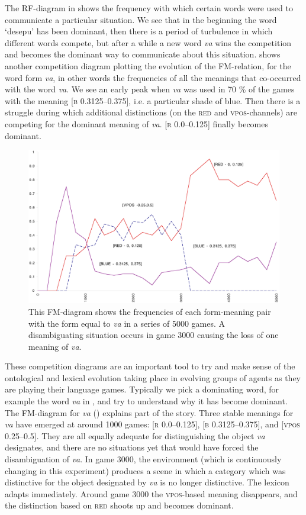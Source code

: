 The RF-diagram in  shows the 
frequency with which certain words were used to communicate 
a particular situation. We see that in
the beginning the word `desepu' has been dominant, then 
there is a period of turbulence in which different 
words compete, but after a while a new word \textit{va} wins 
the competition and becomes the dominant way to communicate 
about this situation.  shows another
competition diagram plotting the evolution of the FM-relation, for 
the word form \textit{va}, in other words the frequencies of 
all the meanings that co-occurred with the word \textit{va}. 
We see an early peak when \textit{va} was used in 70 \% of the 
games with the meaning [\textsc{b} 0.3125–0.375], i.e. a particular
shade of blue. Then there is a struggle during which additional
distinctions (on the \textsc{red} and \textsc{vpos}-channels) are competing
for the dominant meaning of \textit{va}. 
[\textsc{r} 0.0–0.125] finally becomes dominant. 

\begin{figure}[htbp]
  \centerline{\includegraphics[width=.80\textwidth]{chap7/figs/fm.pdf}}
\caption{\label{FM-diagram}This FM-diagram shows
the frequencies of each form-meaning pair with 
the form equal to \textit{va} in a series of 5000 games.
A disambiguating situation occurs in game 3000
causing the loss of one meaning of \textit{va}.}
\end{figure}

These competition diagrams are an important tool to try 
and make sense of the ontological and lexical evolution
taking place in evolving groups of agents as they are
playing their language games. Typically we pick
a dominating word, for example the word \textit{va} in 
, and try to understand
why it has become dominant. 
The FM-diagram for \textit{va} () explains
part of the story. Three stable meanings for \textit{va} have emerged
at  around 1000 games: 
[\textsc{r} 0.0–0.125], [\textsc{b} 0.3125–0.375], and [\textsc{vpos} 0.25–0.5]. 
They are all equally adequate for distinguishing the object
\textit{va} designates, and there are no situations yet
that would have forced the disambiguation of \textit{va}. 
In game 3000, the environment (which is continuously 
changing in this experiment) produces a scene in which
a category which was distinctive for the object designated by 
\textit{va} is no longer distinctive. The lexicon adapts 
immediately. Around game 3000 the \textsc{vpos}-based meaning disappears, 
and the distinction based on \textsc{red} shoots up and becomes dominant. 

